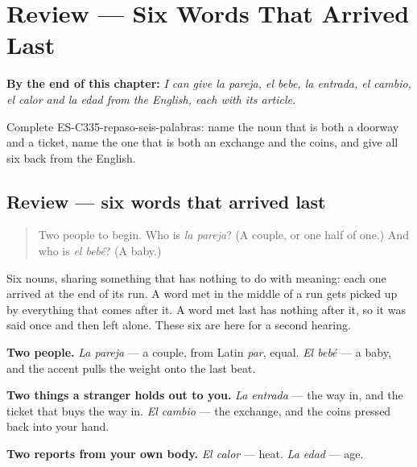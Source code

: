 
\chapter{Review --- Six Words That Arrived Last}
\label{ch:repaso-seis-palabras}

\begin{chapteropening}
\textbf{By the end of this chapter:} \emph{I can give la pareja, el bebe, la entrada, el cambio, el calor and la edad from the English, each with its article.}

Complete ES-C335-repaso-seis-palabras: name the noun that is both a doorway and a ticket, name the one that is both an exchange and the coins, and give all six back from the English.
\end{chapteropening}

\section[(review)]{Review --- six words that arrived last}

\label{lesson:ES-C335-repaso-seis-palabras}



\begin{quote}
Two people to begin. Who is \emph{la pareja}? (A couple, or one half of one.) And who is \emph{el bebé}? (A baby.)
\end{quote}

\begin{grammarlens}[title={What you've built}]
Six nouns, sharing something that has nothing to do with meaning: each one arrived at the end of its run. A word met in the middle of a run gets picked up by everything that comes after it. A word met last has nothing after it, so it was said once and then left alone. These six are here for a second hearing.

\textbf{Two people.} \emph{La pareja} --- a couple, from Latin \emph{par}, equal. \emph{El bebé} --- a baby, and the accent pulls the weight onto the last beat.

\textbf{Two things a stranger holds out to you.} \emph{La entrada} --- the way in, and the ticket that buys the way in. \emph{El cambio} --- the exchange, and the coins pressed back into your hand.

\textbf{Two reports from your own body.} \emph{El calor} --- heat. \emph{La edad} --- age.
\end{grammarlens}

